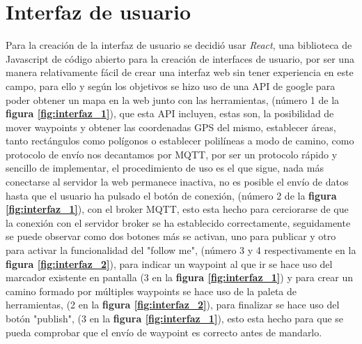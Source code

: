 \newpage
\section{Interfaz de usuario}

Para la creación de la interfaz de usuario se decidió usar \textit{React}, una biblioteca de Javascript de código abierto para la creación de 
interfaces de usuario, por ser una manera relativamente fácil de crear una interfaz web sin tener experiencia en este campo, para ello 
y según los objetivos se hizo uso de una API de google para poder obtener un mapa en la web junto con las herramientas, 
(número 1 de la \textbf{figura \ref{fig:interfaz_1}}), que esta API incluyen, estas son, la posibilidad de mover waypoints y obtener 
las coordenadas GPS del mismo, establecer áreas, tanto rectángulos como polígonos o establecer polilíneas a modo de camino, como 
protocolo de envío nos decantamos por MQTT, por ser un protocolo rápido y sencillo de implementar, el procedimiento de uso es el que 
sigue, nada más conectarse al servidor la web permanece inactiva, no es posible el envío de datos hasta que el usuario ha pulsado el 
botón de conexión, (número 2 de la \textbf{figura \ref{fig:interfaz_1}}), con el broker MQTT, esto esta hecho para cerciorarse de que 
la conexión con el servidor broker se ha establecido correctamente, seguidamente se puede observar como dos botones más se activan, 
uno para publicar y otro para activar la funcionalidad del "follow me", (número 3 y 4 respectivamente en la 
\textbf{ figura \ref{fig:interfaz_2}}), para indicar un waypoint al que ir se hace uso del marcador existente en pantalla 
(3 en la \textbf{figura \ref{fig:interfaz_1}}) y para crear un camino formado por múltiples waypoints se hace uso de la paleta de 
herramientas, (2 en la \textbf{figura \ref{fig:interfaz_2}}), para finalizar se hace uso del botón "publish", 
(3 en la \textbf{figura \ref{fig:interfaz_1}}), esto esta hecho para que se pueda comprobar que el envío de waypoint es correcto antes 
de mandarlo.

